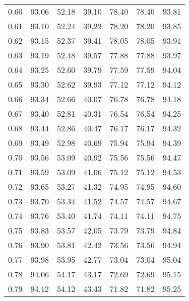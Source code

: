\begin{tabular}{|c|c|c|c|c|c|c|}
      0.60 &     93.06 &     52.18 &      39.10 &   78.40 &      78.40 &         93.81 \\
      0.61 &     93.10 &     52.24 &      39.22 &   78.20 &      78.20 &         93.85 \\
      0.62 &     93.15 &     52.37 &      39.41 &   78.05 &      78.05 &         93.91 \\
      0.63 &     93.19 &     52.48 &      39.57 &   77.88 &      77.88 &         93.97 \\
      0.64 &     93.25 &     52.60 &      39.79 &   77.59 &      77.59 &         94.04 \\
      0.65 &     93.30 &     52.62 &      39.93 &   77.12 &      77.12 &         94.12 \\
      0.66 &     93.34 &     52.66 &      40.07 &   76.78 &      76.78 &         94.18 \\
      0.67 &     93.40 &     52.81 &      40.31 &   76.54 &      76.54 &         94.25 \\
      0.68 &     93.44 &     52.86 &      40.47 &   76.17 &      76.17 &         94.32 \\
      0.69 &     93.49 &     52.98 &      40.69 &   75.94 &      75.94 &         94.39 \\
      0.70 &     93.56 &     53.09 &      40.92 &   75.56 &      75.56 &         94.47 \\
      0.71 &     93.59 &     53.09 &      41.06 &   75.12 &      75.12 &         94.53 \\
      0.72 &     93.65 &     53.27 &      41.32 &   74.95 &      74.95 &         94.60 \\
      0.73 &     93.70 &     53.34 &      41.52 &   74.57 &      74.57 &         94.67 \\
      0.74 &     93.76 &     53.40 &      41.74 &   74.11 &      74.11 &         94.75 \\
      0.75 &     93.83 &     53.57 &      42.05 &   73.79 &      73.79 &         94.84 \\
      0.76 &     93.90 &     53.81 &      42.42 &   73.56 &      73.56 &         94.94 \\
      0.77 &     93.98 &     53.95 &      42.77 &   73.04 &      73.04 &         95.04 \\
      0.78 &     94.06 &     54.17 &      43.17 &   72.69 &      72.69 &         95.15 \\
      0.79 &     94.12 &     54.12 &      43.43 &   71.82 &      71.82 &         95.25 \\

\end{tabular}
